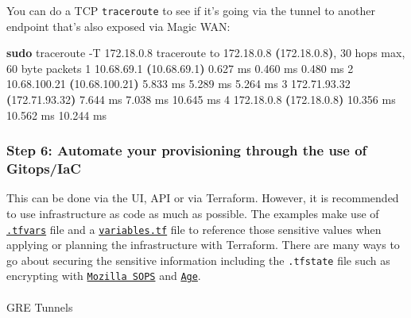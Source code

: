 \documentclass[
]{article}
\makeatletter
\let\oldparagraph\paragraph
\renewcommand{\paragraph}{
    \@ifstar
      \xxxParagraphStar
      \xxxParagraphNoStar
  }
\newcommand{\xxxParagraphStar}[1]{\oldparagraph*{#1}\mbox{}}
\newcommand{\xxxParagraphNoStar}[1]{\oldparagraph{#1}\mbox{}}
\newenvironment{Shaded}{\begin{snugshade}}{\end{snugshade}}
\newcommand{\AttributeTok}[1]{\textcolor[rgb]{0.13,0.29,0.53}{#1}}
\newcommand{\ErrorTok}[1]{\textcolor[rgb]{0.64,0.00,0.00}{\textbf{#1}}}
\newcommand{\ExtensionTok}[1]{#1}
\newcommand{\FunctionTok}[1]{\textcolor[rgb]{0.13,0.29,0.53}{\textbf{#1}}}
\newcommand{\KeywordTok}[1]{\textcolor[rgb]{0.13,0.29,0.53}{\textbf{#1}}}
\newcommand{\NormalTok}[1]{#1}
\makeatother
\begin{document}
You can do a TCP \texttt{traceroute} to see if it's going via the tunnel
to another endpoint that's also exposed via Magic WAN:

\begin{Shaded}
\begin{Highlighting}[numbers=left,,]
\FunctionTok{sudo}\NormalTok{ traceroute }\AttributeTok{{-}T}\NormalTok{ 172.18.0.8}
\ExtensionTok{traceroute}\NormalTok{ to 172.18.0.8 }\ErrorTok{(}\ExtensionTok{172.18.0.8}\KeywordTok{)}\ExtensionTok{,}\NormalTok{ 30 hops max, 60 byte packets}
 \ExtensionTok{1}\NormalTok{  10.68.69.1 }\ErrorTok{(}\ExtensionTok{10.68.69.1}\KeywordTok{)}  \ExtensionTok{0.627}\NormalTok{ ms  0.460 ms  0.480 ms}
 \ExtensionTok{2}\NormalTok{  10.68.100.21 }\ErrorTok{(}\ExtensionTok{10.68.100.21}\KeywordTok{)}  \ExtensionTok{5.833}\NormalTok{ ms  5.289 ms  5.264 ms}
 \ExtensionTok{3}\NormalTok{  172.71.93.32 }\ErrorTok{(}\ExtensionTok{172.71.93.32}\KeywordTok{)}  \ExtensionTok{7.644}\NormalTok{ ms  7.038 ms  10.645 ms}
 \ExtensionTok{4}\NormalTok{  172.18.0.8 }\ErrorTok{(}\ExtensionTok{172.18.0.8}\KeywordTok{)}  \ExtensionTok{10.356}\NormalTok{ ms  10.562 ms  10.244 ms}
\end{Highlighting}
\end{Shaded}

\newpage{}

\subsubsection{Step 6: Automate your provisioning through the use of
Gitops/IaC}\label{step-6-automate-your-provisioning-through-the-use-of-gitopsiac}

This can be done via the UI, API or via Terraform. However, it is
recommended to use infrastructure as code as much as possible. The
examples make use of
\href{https://developer.hashicorp.com/terraform/language/values/variables\#variable-definitions-tfvars-files}{\texttt{.tfvars}}
file and a
\href{https://developer.hashicorp.com/terraform/language/values/variables\#declaring-an-input-variable}{\texttt{variables.tf}}
file to reference those sensitive values when applying or planning the
infrastructure with Terraform. There are many ways to go about securing
the sensitive information including the \texttt{.tfstate} file such as
encrypting with
\href{https://github.com/getsops/sops}{\texttt{Mozilla\ SOPS}} and
\href{https://github.com/FiloSottile/age}{\texttt{Age}}.

\paragraph{GRE Tunnels}\label{gre-tunnels}
\end{document}
